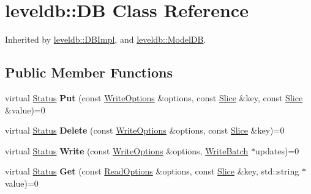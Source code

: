 \hypertarget{classleveldb_1_1_d_b}{}\section{leveldb\+::DB Class Reference}
\label{classleveldb_1_1_d_b}


Inherited by \mbox{\hyperlink{classleveldb_1_1_d_b_impl}{leveldb\+::\+D\+B\+Impl}}, and \mbox{\hyperlink{classleveldb_1_1_model_d_b}{leveldb\+::\+Model\+DB}}.

\subsection*{Public Member Functions}
\begin{DoxyCompactItemize}
\item 
\mbox{\label{classleveldb_1_1_d_b_ac2e472812630ed74298df7b03b08c1ae}} 
virtual \mbox{\hyperlink{classleveldb_1_1_status}{Status}} {\bfseries Put} (const \mbox{\hyperlink{structleveldb_1_1_write_options}{Write\+Options}} \&options, const \mbox{\hyperlink{classleveldb_1_1_slice}{Slice}} \&key, const \mbox{\hyperlink{classleveldb_1_1_slice}{Slice}} \&value)=0
\item 
\mbox{\label{classleveldb_1_1_d_b_aff7577239799cd059464701c548090b9}} 
virtual \mbox{\hyperlink{classleveldb_1_1_status}{Status}} {\bfseries Delete} (const \mbox{\hyperlink{structleveldb_1_1_write_options}{Write\+Options}} \&options, const \mbox{\hyperlink{classleveldb_1_1_slice}{Slice}} \&key)=0
\item 
\mbox{\label{classleveldb_1_1_d_b_ae0b6ded8c8e0b88ff70190bf7a0c086c}} 
virtual \mbox{\hyperlink{classleveldb_1_1_status}{Status}} {\bfseries Write} (const \mbox{\hyperlink{structleveldb_1_1_write_options}{Write\+Options}} \&options, \mbox{\hyperlink{classleveldb_1_1_write_batch}{Write\+Batch}} $\ast$updates)=0
\item 
\mbox{\label{classleveldb_1_1_d_b_ad43bd7937b9af88ff856eb8158890911}} 
virtual \mbox{\hyperlink{classleveldb_1_1_status}{Status}} {\bfseries Get} (const \mbox{\hyperlink{structleveldb_1_1_read_options}{Read\+Options}} \&options, const \mbox{\hyperlink{classleveldb_1_1_slice}{Slice}} \&key, std\+::string $\ast$value)=0
\item 

\end{DoxyCompactItemize}
